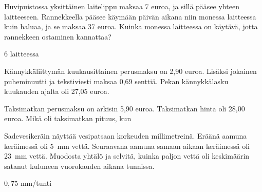 \begin{tehtavasivu}
\begin{tehtava}
Huvipuistossa yksittäinen laitelippu maksaa 7 euroa, ja sillä pääsee yhteen laitteeseen. Rannekkeella pääsee käymään päivän aikana niin monessa laitteessa kuin haluaa, ja se maksaa 37 euroa. Kuinka monessa laitteessa on käytävä, jotta rannekkeen ostaminen kannattaa?
\begin{vastaus}
$6$ laitteessa
\end{vastaus}
\end{tehtava}

\begin{tehtava}
Kännykkäliittymän kuukausittainen perusmaksu on 2,90 euroa. Lisäksi jokainen puheminuutti ja tekstiviesti maksaa 0,69 senttiä. Pekan kännykkälasku kuukauden
ajalta oli 27,05 euroa.

\begin{alakohdat}
\end{alakohdat}

	\begin{vastaus}
		\begin{alakohdat}
		\end{alakohdat}
	\end{vastaus}
\end{tehtava}

\begin{tehtava}
 Taksimatkan perusmaksu on arkisin 5,90 euroa. Taksimatkan hinta oli 28,00 euroa. Mikä oli taksimatkan pituus, kun
\begin{alakohdat}
\end{alakohdat}
	\begin{vastaus}
		\begin{alakohdat}
			\alakohta{14,5 kilometriä}
			\alakohta{10,4 kilometriä}
		\end{alakohdat}
	\end{vastaus}
\end{tehtava}


\begin{tehtava}
Sadevesikeräin näyttää vesipatsaan korkeuden millimetreinä. Eräänä aamuna
keräimessä oli 5~mm vettä. Seuraavana aamuna samaan aikaan keräimessä oli 23~mm vettä. Muodosta yhtälö ja selvitä, kuinka paljon vettä oli keskimäärin satanut kuluneen vuorokauden aikana tunnissa.
	\begin{vastaus}
	$0,75$ mm/tunti
	\end{vastaus}
\end{tehtava}


\end{tehtavasivu}

